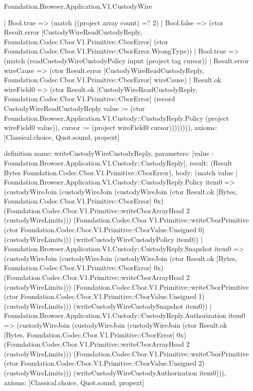 \begin{lexlean}{Foundation.Browser.Application.V1.CustodyWire}
\begin{semanticmodule}
{        | Bool.true => (match ((project array count) =? 2)
          | Bool.false => (ctor Result.error [CustodyWireReadCustodyReply, Foundation.Codec.Cbor.V1.Primitive::CborError] (ctor Foundation.Codec.Cbor.V1.Primitive::CborError.WrongType))
          | Bool.true => (match (readCustodyWireCustodyPolicy input (project tag cursor))
            | Result.error wireCause => (ctor Result.error [CustodyWireReadCustodyReply, Foundation.Codec.Cbor.V1.Primitive::CborError] wireCause)
            | Result.ok wireField0 => (ctor Result.ok [CustodyWireReadCustodyReply, Foundation.Codec.Cbor.V1.Primitive::CborError] (record CustodyWireReadCustodyReply {value := (ctor Foundation.Browser.Application.V1.Custody::CustodyReply.Policy (project wireField0 value)), cursor := (project wireField0 cursor)}))))))),
  axioms: [Classical.choice, Quot.sound, propext]
}

definition{
  name: writeCustodyWireCustodyReply,
  parameters: [value : Foundation.Browser.Application.V1.Custody::CustodyReply],
  result: (Result Bytes Foundation.Codec.Cbor.V1.Primitive::CborError),
  body: (match value
    | Foundation.Browser.Application.V1.Custody::CustodyReply.Policy item0 => (custodyWireJoin (custodyWireJoin (custodyWireJoin (ctor Result.ok [Bytes, Foundation.Codec.Cbor.V1.Primitive::CborError] 0x) (Foundation.Codec.Cbor.V1.Primitive::writeCborArrayHead 2 (custodyWireLimits))) (Foundation.Codec.Cbor.V1.Primitive::writeCborPrimitive (ctor Foundation.Codec.Cbor.V1.Primitive::CborValue.Unsigned 0) (custodyWireLimits))) (writeCustodyWireCustodyPolicy item0))
    | Foundation.Browser.Application.V1.Custody::CustodyReply.Snapshot item0 => (custodyWireJoin (custodyWireJoin (custodyWireJoin (ctor Result.ok [Bytes, Foundation.Codec.Cbor.V1.Primitive::CborError] 0x) (Foundation.Codec.Cbor.V1.Primitive::writeCborArrayHead 2 (custodyWireLimits))) (Foundation.Codec.Cbor.V1.Primitive::writeCborPrimitive (ctor Foundation.Codec.Cbor.V1.Primitive::CborValue.Unsigned 1) (custodyWireLimits))) (writeCustodyWireCustodySnapshot item0))
    | Foundation.Browser.Application.V1.Custody::CustodyReply.Authorization item0 => (custodyWireJoin (custodyWireJoin (custodyWireJoin (ctor Result.ok [Bytes, Foundation.Codec.Cbor.V1.Primitive::CborError] 0x) (Foundation.Codec.Cbor.V1.Primitive::writeCborArrayHead 2 (custodyWireLimits))) (Foundation.Codec.Cbor.V1.Primitive::writeCborPrimitive (ctor Foundation.Codec.Cbor.V1.Primitive::CborValue.Unsigned 2) (custodyWireLimits))) (writeCustodyWireCustodyAuthorization item0))),
  axioms: [Classical.choice, Quot.sound, propext]
}


\end{semanticmodule}
\end{lexlean}
